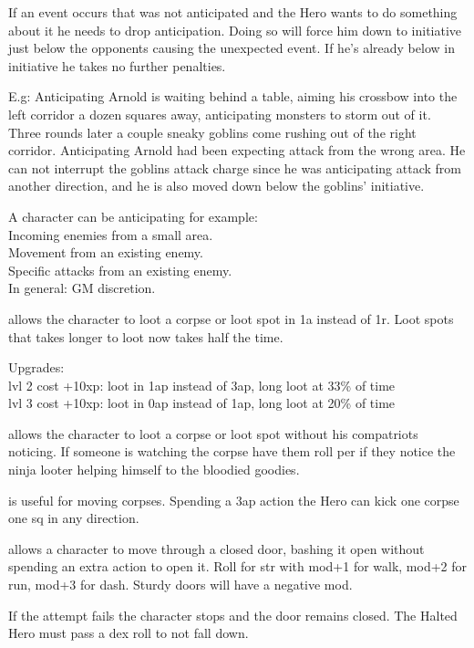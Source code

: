 If an event occurs that was not anticipated and the Hero wants to do something about it he needs to drop anticipation. Doing so will force him down to initiative just below the opponents causing the unexpected event. If he's already below in initiative he takes no further penalties.

E.g: Anticipating Arnold is waiting behind a table, aiming his crossbow into the left corridor a dozen squares away, anticipating monsters to storm out of it. Three rounds later a couple sneaky goblins come rushing out of the right corridor. Anticipating Arnold had been expecting attack from the wrong area. He can not interrupt the goblins attack charge since he was anticipating attack from another direction, and he is also moved down below the goblins' initiative.

A character can be anticipating for example: \\
Incoming enemies from a small area. \\
Movement from an existing enemy. \\
Specific attacks from an existing enemy. \\
In general: GM discretion.


 allows the character to loot a corpse or loot spot in 1a instead of 1r. Loot spots that takes longer to loot now takes half the time.

Upgrades:\\
lvl 2 cost +10xp: loot in 1ap instead of 3ap, long loot at 33\% of time\\
lvl 3 cost +10xp: loot in 0ap instead of 1ap, long loot at 20\% of time


 allows the character to loot a corpse or loot spot without his compatriots noticing. If someone is watching the corpse have them roll per if they notice the ninja looter helping himself to the bloodied goodies.


 is useful for moving corpses. Spending a 3ap action the Hero can kick one corpse one sq in any direction.


 allows a character to move through a closed door, bashing it open without spending an extra action to open it. Roll for str with mod+1 for walk, mod+2 for run, mod+3 for dash. Sturdy doors will have a negative mod.

If the attempt fails the character stops and the door remains closed. The Halted Hero must pass a dex roll to not fall down.




